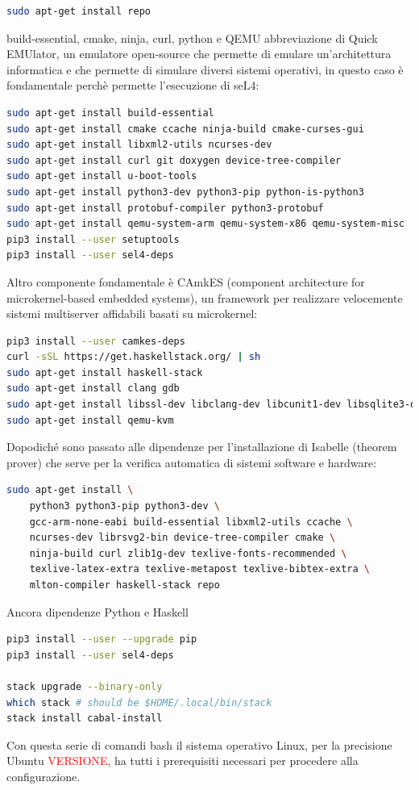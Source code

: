 \lstset{style=mystyle}

\begin{lstlisting}[language=bash]
sudo apt-get install repo
\end{lstlisting}
build-essential, cmake, ninja, curl, python e QEMU abbreviazione di Quick EMUlator, un emulatore open-source che permette di emulare un'architettura informatica e che permette di simulare diversi sistemi operativi, in questo caso è fondamentale perchè permette l'esecuzione di seL4:
\begin{lstlisting}[language=bash]
sudo apt-get install build-essential
sudo apt-get install cmake ccache ninja-build cmake-curses-gui
sudo apt-get install libxml2-utils ncurses-dev
sudo apt-get install curl git doxygen device-tree-compiler
sudo apt-get install u-boot-tools
sudo apt-get install python3-dev python3-pip python-is-python3
sudo apt-get install protobuf-compiler python3-protobuf
sudo apt-get install qemu-system-arm qemu-system-x86 qemu-system-misc
pip3 install --user setuptools
pip3 install --user sel4-deps
\end{lstlisting}
Altro componente fondamentale è CAmkES (component architecture for microkernel-based embedded systems), un framework per realizzare velocemente sistemi multiserver affidabili basati su microkernel:
\begin{lstlisting}[language=bash]
pip3 install --user camkes-deps
curl -sSL https://get.haskellstack.org/ | sh
sudo apt-get install haskell-stack
sudo apt-get install clang gdb
sudo apt-get install libssl-dev libclang-dev libcunit1-dev libsqlite3-dev
sudo apt-get install qemu-kvm
\end{lstlisting}
Dopodiché sono passato alle dipendenze per l'installazione di Isabelle (theorem prover) che serve per la verifica automatica di sistemi software e hardware:
\begin{lstlisting}[language=bash]
sudo apt-get install \
    python3 python3-pip python3-dev \
    gcc-arm-none-eabi build-essential libxml2-utils ccache \
    ncurses-dev librsvg2-bin device-tree-compiler cmake \
    ninja-build curl zlib1g-dev texlive-fonts-recommended \
    texlive-latex-extra texlive-metapost texlive-bibtex-extra \
    mlton-compiler haskell-stack repo
\end{lstlisting}
Ancora dipendenze Python e Haskell
\begin{lstlisting}[language=bash]
pip3 install --user --upgrade pip
pip3 install --user sel4-deps

stack upgrade --binary-only
which stack # should be $HOME/.local/bin/stack
stack install cabal-install
\end{lstlisting}
Con questa serie di comandi bash il sistema operativo Linux, per la precisione Ubuntu \textcolor{red}{VERSIONE}, ha tutti i prerequisiti necessari per procedere alla configurazione.

